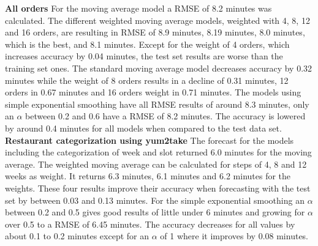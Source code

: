 \newline\newline\textbf{All orders}\newline
For the moving average model a RMSE of 8.2 minutes was calculated. The different weighted moving average models, weighted with 4, 8, 12 and 16 orders, are resulting in RMSE of 8.9 minutes, 8.19 minutes, 8.0 minutes, which is the best, and 8.1 minutes. Except for the weight of 4 orders, which increases accuracy by 0.04 minutes, the test set results are worse than the training set ones. The standard moving average model decreases accuracy by 0.32 minutes while the weight of 8 orders results in a decline of 0.31 minutes, 12 orders in 0.67 minutes and 16 orders weight in 0.71 minutes. The models using simple exponential smoothing have all RMSE results of around 8.3 minutes, only an $\alpha$ between 0.2 and 0.6 have a RMSE of 8.2 minutes. The accuracy is lowered by around 0.4 minutes for all models when compared to the test data set.
\newline\newline\textbf{Restaurant categorization using yum2take}\newline
The forecast for the models including the categorization of week and slot returned 6.0 minutes for the moving average. The weighted moving average can be calculated for steps of 4, 8 and 12 weeks as weight. It returns 6.3 minutes, 6.1 minutes and 6.2 minutes for the weights. These four results improve their accuracy when forecasting with the test set by between 0.03 and 0.13 minutes. For the simple exponential smoothing an $\alpha$ between 0.2 and 0.5 gives good results of little under 6 minutes and growing for $\alpha$ over 0.5 to a RMSE of 6.45 minutes. The accuracy decreases for all values by about 0.1 to 0.2 minutes except for an $\alpha$ of 1 where it improves by 0.08 minutes.
